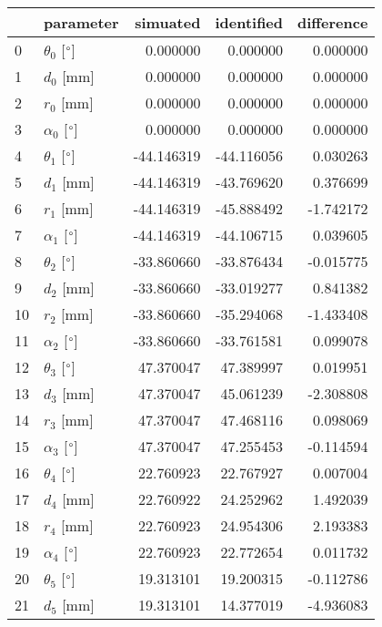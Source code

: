 \documentclass{standalone}%
\begin{document}
%
\normalsize%
\begin{tabular}{llrrr}
\toprule
{} &                 parameter &   simuated & identified & difference \\
\midrule
0  &  $\theta_{0}$ [$\degree$] &   0.000000 &   0.000000 &   0.000000 \\
1  &              $d_{0}$ [mm] &   0.000000 &   0.000000 &   0.000000 \\
2  &              $r_{0}$ [mm] &   0.000000 &   0.000000 &   0.000000 \\
3  &  $\alpha_{0}$ [$\degree$] &   0.000000 &   0.000000 &   0.000000 \\
4  &  $\theta_{1}$ [$\degree$] & -44.146319 & -44.116056 &   0.030263 \\
5  &              $d_{1}$ [mm] & -44.146319 & -43.769620 &   0.376699 \\
6  &              $r_{1}$ [mm] & -44.146319 & -45.888492 &  -1.742172 \\
7  &  $\alpha_{1}$ [$\degree$] & -44.146319 & -44.106715 &   0.039605 \\
8  &  $\theta_{2}$ [$\degree$] & -33.860660 & -33.876434 &  -0.015775 \\
9  &              $d_{2}$ [mm] & -33.860660 & -33.019277 &   0.841382 \\
10 &              $r_{2}$ [mm] & -33.860660 & -35.294068 &  -1.433408 \\
11 &  $\alpha_{2}$ [$\degree$] & -33.860660 & -33.761581 &   0.099078 \\
12 &  $\theta_{3}$ [$\degree$] &  47.370047 &  47.389997 &   0.019951 \\
13 &              $d_{3}$ [mm] &  47.370047 &  45.061239 &  -2.308808 \\
14 &              $r_{3}$ [mm] &  47.370047 &  47.468116 &   0.098069 \\
15 &  $\alpha_{3}$ [$\degree$] &  47.370047 &  47.255453 &  -0.114594 \\
16 &  $\theta_{4}$ [$\degree$] &  22.760923 &  22.767927 &   0.007004 \\
17 &              $d_{4}$ [mm] &  22.760922 &  24.252962 &   1.492039 \\
18 &              $r_{4}$ [mm] &  22.760923 &  24.954306 &   2.193383 \\
19 &  $\alpha_{4}$ [$\degree$] &  22.760923 &  22.772654 &   0.011732 \\
20 &  $\theta_{5}$ [$\degree$] &  19.313101 &  19.200315 &  -0.112786 \\
21 &              $d_{5}$ [mm] &  19.313101 &  14.377019 &  -4.936083 \\

\end{tabular}
\end{document}
